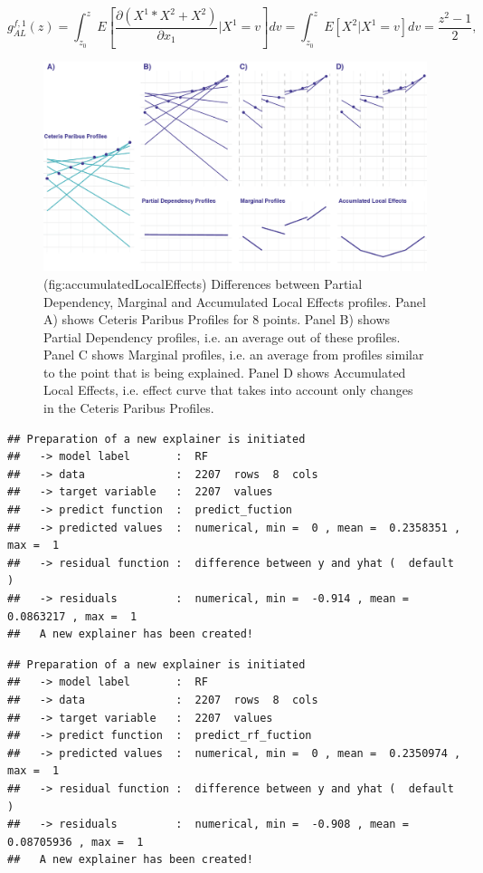 \documentclass[12pt,]{krantz}
\begin{document}
\[
g_{AL}^{f,1}(z) = \int_{z_0}^z E\left[\frac{\partial (X^1*X^2 + X^2)}{\partial x_1}|X^1 = v\right] dv  = \int_{z_0}^z E\left[X^2|X^1 = v\right] dv  = \frac{z^2 -1 }{2},
\]

\begin{figure}

{\centering \includegraphics[width=0.9\linewidth]{figure/CP_ALL} 

}

\caption{(fig:accumulatedLocalEffects) Differences between Partial Dependency, Marginal and Accumulated Local Effects profiles. Panel A) shows Ceteris Paribus Profiles for 8 points. Panel B) shows Partial Dependency profiles, i.e. an average out of these profiles. Panel C shows Marginal profiles, i.e. an average from profiles similar to the point that is being explained. Panel D shows Accumulated Local Effects, i.e. effect curve that takes into account only changes in the Ceteris Paribus Profiles.}\label{fig:accumulatedLocalEffects}
\end{figure}

\begin{verbatim}
## Preparation of a new explainer is initiated
##   -> model label       :  RF 
##   -> data              :  2207  rows  8  cols 
##   -> target variable   :  2207  values 
##   -> predict function  :  predict_fuction 
##   -> predicted values  :  numerical, min =  0 , mean =  0.2358351 , max =  1  
##   -> residual function :  difference between y and yhat (  default  )
##   -> residuals         :  numerical, min =  -0.914 , mean =  0.0863217 , max =  1  
##   A new explainer has been created!
\end{verbatim}

\begin{verbatim}
## Preparation of a new explainer is initiated
##   -> model label       :  RF 
##   -> data              :  2207  rows  8  cols 
##   -> target variable   :  2207  values 
##   -> predict function  :  predict_rf_fuction 
##   -> predicted values  :  numerical, min =  0 , mean =  0.2350974 , max =  1  
##   -> residual function :  difference between y and yhat (  default  )
##   -> residuals         :  numerical, min =  -0.908 , mean =  0.08705936 , max =  1  
##   A new explainer has been created!
\end{verbatim}
\end{document}
